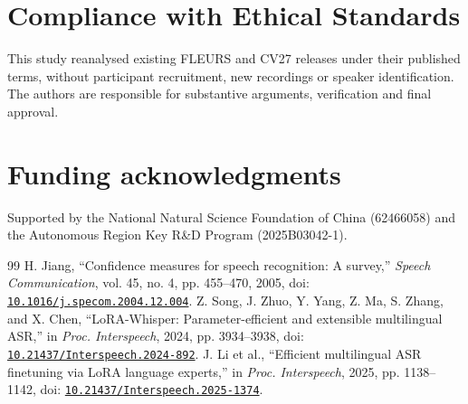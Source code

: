 \documentclass{article}
\begin{document}
\section{Compliance with Ethical Standards}
This study reanalysed existing FLEURS and CV27 releases under their published terms, without participant recruitment, new recordings or speaker identification. The authors are responsible for substantive arguments, verification and final approval.
\section{Funding acknowledgments}
Supported by the National Natural Science Foundation of China (62466058) and the Autonomous Region Key R\&D Program (2025B03042-1).
\begin{thebibliography}{99}
 H. Jiang, ``Confidence measures for speech recognition: A survey,'' \emph{Speech Communication}, vol. 45, no. 4, pp. 455--470, 2005, doi: \href{https://doi.org/10.1016/j.specom.2004.12.004}{\nolinkurl{10.1016/j.specom.2004.12.004}}.
 Z. Song, J. Zhuo, Y. Yang, Z. Ma, S. Zhang, and X. Chen, ``LoRA-Whisper: Parameter-efficient and extensible multilingual ASR,'' in \emph{Proc. Interspeech}, 2024, pp. 3934--3938, doi: \href{https://doi.org/10.21437/Interspeech.2024-892}{\nolinkurl{10.21437/Interspeech.2024-892}}.
 J. Li et al., ``Efficient multilingual ASR finetuning via LoRA language experts,'' in \emph{Proc. Interspeech}, 2025, pp. 1138--1142, doi: \href{https://doi.org/10.21437/Interspeech.2025-1374}{\nolinkurl{10.21437/Interspeech.2025-1374}}.


\end{thebibliography}
\end{document}
